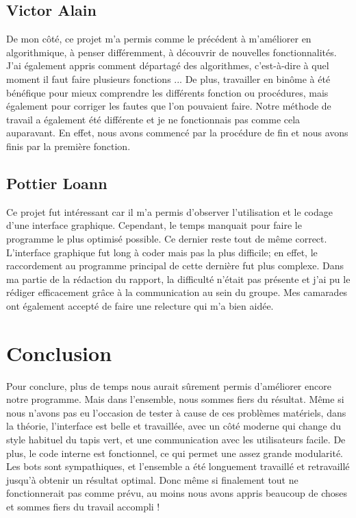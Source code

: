 \documentclass[12pt]{report}
\begin{document}
\vspace{15pt}

\subsection{Victor Alain}

De mon côté, ce projet m'a permis comme le précédent à m'améliorer en algorithmique, à penser différemment, à découvrir de nouvelles fonctionnalités. J'ai également appris comment départagé des algorithmes, c'est-à-dire à quel moment il faut faire plusieurs fonctions ... De plus, travailler en binôme à été bénéfique pour mieux comprendre les différents fonction ou procédures, mais également pour corriger les fautes que l'on pouvaient faire. Notre méthode de travail a également été différente et je ne fonctionnais pas comme cela auparavant. En effet, nous avons commencé par la procédure de fin et nous avons finis par la première fonction.

\vspace{15pt}

\subsection{Pottier Loann}

Ce projet fut intéressant car il m'a permis d'observer l'utilisation et le codage d'une interface graphique. Cependant, le temps manquait pour faire le programme le plus optimisé possible. Ce dernier reste tout de même correct. L'interface graphique fut long à coder mais pas la plus difficile; en effet, le raccordement au programme principal de cette dernière fut plus complexe. Dans ma partie de la rédaction du rapport, la difficulté n'était pas présente et j'ai pu le rédiger efficacement grâce à la communication au sein du groupe. Mes camarades ont également accepté de faire une relecture qui m'a bien aidée.
\clearpage
\section{Conclusion}

	Pour conclure, plus de temps nous aurait sûrement permis d’améliorer encore notre programme. Mais dans l’ensemble, nous sommes fiers du résultat. Même si nous n'avons pas eu l'occasion de tester à cause de ces problèmes matériels, dans la théorie, l'interface est belle et travaillée, avec un côté moderne qui change du style habituel du tapis vert, et une communication avec les utilisateurs facile. De plus, le code interne est fonctionnel, ce qui permet une assez grande modularité. Les bots sont sympathiques, et l'ensemble a été longuement travaillé et retravaillé jusqu'à obtenir un résultat optimal. Donc même si finalement tout ne fonctionnerait pas comme prévu, au moins nous avons appris beaucoup de choses et sommes fiers du travail accompli !
			
\end{document}
